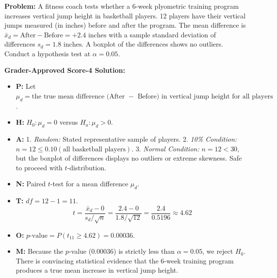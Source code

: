 \begin{workbookbox}
\textbf{Problem:} A fitness coach tests whether a 6-week plyometric training program increases vertical jump height in basketball players. 12 players have their vertical jumps measured (in inches) before and after the program. The mean difference is $\bar{x}_d = \text{After} - \text{Before} = +2.4\text{ inches}$ with a sample standard deviation of differences $s_d = 1.8\text{ inches}$. A boxplot of the differences shows no outliers. Conduct a hypothesis test at $\alpha = 0.05$.

\textbf{Grader-Approved Score-4 Solution:}
\begin{itemize}[leftmargin=1.2em]
  \item \textbf{P:} Let $\mu_d = \text{the true mean difference (After } - \text{ Before) in vertical jump height for all players}$.
  \item \textbf{H:} $H_0: \mu_d = 0$ versus $H_a: \mu_d > 0$.
  \item \textbf{A:}
  1. \textit{Random:} Stated representative sample of players.
  2. \textit{10\% Condition:} $n = 12 \le 0.10(\text{all basketball players})$.
  3. \textit{Normal Condition:} $n = 12 < 30$, but the boxplot of differences displays no outliers or extreme skewness. Safe to proceed with $t$-distribution.
  \item \textbf{N:} Paired $t$-test for a mean difference $\mu_d$.
  \item \textbf{T:} $df = 12 - 1 = 11$.
  \[ t = \frac{\bar{x}_d - 0}{s_d / \sqrt{n}} = \frac{2.4 - 0}{1.8 / \sqrt{12}} = \frac{2.4}{0.5196} \approx 4.62 \]
  \item \textbf{O:} $p\text{-value} = P(t_{11} \ge 4.62) = \mathbf{0.00036}$.
  \item \textbf{M:} Because the $p$-value ($0.00036$) is strictly less than $\alpha = 0.05$, we reject $H_0$. There is convincing statistical evidence that the 6-week training program produces a true mean increase in vertical jump height.
\end{itemize}
\end{workbookbox}


